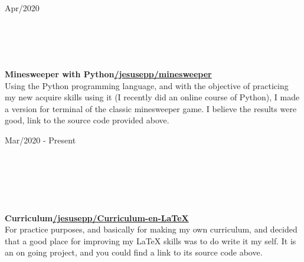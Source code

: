 \documentclass[10pt]{article}
\begin{document}
\begin{vwcol}[widths={0.235,0.765},
 sep=.8cm, rule=0pt,indent=0em,lines=5] 
\hspace{5pt}Apr/2020\par
    \hfill\\
    \hfill\\
    \hfill\\
    \hfill\\
    \textbf{Minesweeper with Python}\hfill \href{https://github.com/jesusepp/minesweeper}{\color{blue!50!black}\textbf{/jesusepp/minesweeper}}\\
    \vspace{5pt}
    Using the Python programming language, and with the objective of practicing my new acquire skills using it (I recently did an online course of Python), I made a version for terminal of the classic minesweeper game. I believe the results were good, link to the source code provided above.\par
\end{vwcol}

\begin{vwcol}[widths={0.235,0.765},
 sep=.8cm, rule=0pt,indent=0em,lines=6] 
\hspace{5pt}Mar/2020 - Present\par
    \hfill\\
    \hfill\\
    \hfill\\
    \hfill\\
    \hfill\\
    \textbf{Curriculum}\hfill \href{https://github.com/jesusepp/Curriculum-en-LaTeX}{\color{blue!50!black}\textbf{/jesusepp/Curriculum-en-LaTeX}}\\
    \vspace{5pt}
    For practice purposes, and basically for making my own curriculum, and decided that a good place for improving my LaTeX skills was to do write it my self. It is an on going project, and you could find a link to its source code above.\par
\end{vwcol}
\end{document}
